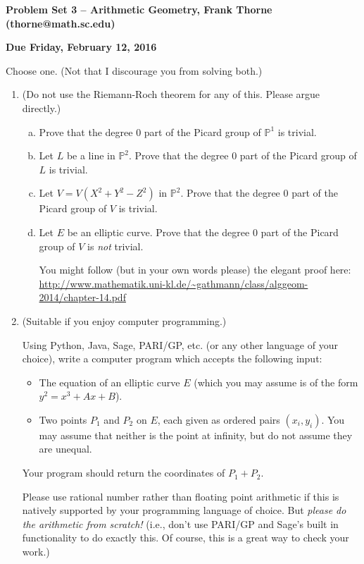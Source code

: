 \documentclass[12pt]{article}
\begin{document}
\setlength{\topmargin}{-2mm}





\begin{center}{\bf Problem Set 3 -- Arithmetic Geometry, Frank Thorne (thorne@math.sc.edu)}
\end{center}
\begin{center}
{\bf Due Friday, February 12, 2016}
\end{center}
Choose one. (Not that I discourage you from solving both.)

\begin{enumerate}[(1)]
\item
(Do not use the Riemann-Roch theorem for any of this. Please argue directly.)
\begin{enumerate}[(a)]
\item
Prove that the degree $0$ part of the Picard group of $\mathbb{P}^1$ is trivial.
\item
Let $L$ be a line in $\mathbb{P}^2$. 
Prove that the degree $0$ part of the Picard group of $L$ is trivial.
\item
Let $V = V(X^2 + Y^2 - Z^2)$ in $\mathbb{P}^2$. 
Prove that the degree $0$ part of the Picard group of $V$ is trivial.
\item
Let $E$ be an elliptic curve. 
Prove that the degree $0$ part of the Picard group of $V$ is {\itshape not} trivial.

You might follow (but in your own words please) the elegant proof here:
\url{http://www.mathematik.uni-kl.de/~gathmann/class/alggeom-2014/chapter-14.pdf}
\end{enumerate}

\item
(Suitable if you enjoy computer programming.)

Using Python, Java, Sage, PARI/GP, etc. (or any other language of your choice), write a computer program which accepts the following input:
\begin{itemize}
\item
The equation of an elliptic curve $E$ (which you may assume is of the form $y^2 = x^3 + Ax + B$).
\item
Two points $P_1$ and $P_2$ on $E$, each given as ordered pairs $(x_i, y_i)$. 
You may assume that neither is the point at infinity, but do not assume they are unequal.
\end{itemize}
Your program should return the coordinates of $P_1 + P_2$.

Please use rational number rather than floating point arithmetic if this is natively supported by your programming language of choice. But
{\itshape please do the arithmetic from scratch!} (i.e., don't use PARI/GP and Sage's built in functionality to do exactly this. Of course, this is a great
way to check your work.)
\end{enumerate}
\end{document}
